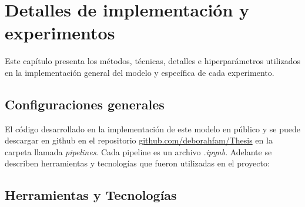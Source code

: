 \chapter{Detalles de implementación y experimentos}\label{chapter:implementation}

Este capítulo presenta los métodos, técnicas, detalles e hiperparámetros utilizados en la implementación general del modelo y específica de cada experimento.

\section*{Configuraciones generales}

El código desarrollado en la implementación de este modelo en público y se puede descargar en github en el repositorio \href{https://github.com/deborahfam/Thesis}{github.com/deborahfam/Thesis} en la carpeta llamada \textit{pipelines}. Cada pipeline es un archivo \textit{.ipynb}. Adelante se describen herramientas y tecnologías que fueron utilizadas en el proyecto:

\section*{Herramientas y Tecnologías}

